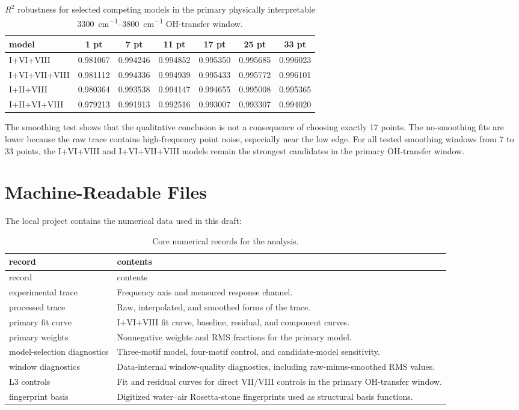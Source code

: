 \documentclass[11pt]{article}
\begin{document}
\begin{table}[H]
\centering
\caption{$R^2$ robustness for selected competing models in the primary physically interpretable \SIrange{3300}{3800}{cm^{-1}} OH-transfer window.}
\begin{tabular}{lcccccc}
\toprule
model & 1 pt & 7 pt & 11 pt & 17 pt & 25 pt & 33 pt \\
\midrule
I+VI+VIII & 0.981067 & 0.994246 & 0.994852 & 0.995350 & 0.995685 & 0.996023 \\
I+VI+VII+VIII & 0.981112 & 0.994336 & 0.994939 & 0.995433 & 0.995772 & 0.996101 \\
I+II+VIII & 0.980364 & 0.993538 & 0.994147 & 0.994655 & 0.995008 & 0.995365 \\
I+II+VI+VIII & 0.979213 & 0.991913 & 0.992516 & 0.993007 & 0.993307 & 0.994020 \\
\bottomrule
\end{tabular}
\end{table}

The smoothing test shows that the qualitative conclusion is not a consequence of choosing exactly 17 points. The no-smoothing fits are lower because the raw trace contains high-frequency point noise, especially near the low edge. For all tested smoothing windows from 7 to 33 points, the I+VI+VIII and I+VI+VII+VIII models remain the strongest candidates in the primary OH-transfer window.

\section*{Machine-Readable Files}

The local project contains the numerical data used in this draft:

\begin{longtable}{p{}p{}}
\caption{Core numerical records for the analysis.}\\
\toprule
record & contents \\
\midrule
\endfirsthead
\toprule
record & contents \\
\midrule
\endhead
experimental trace & Frequency axis and measured response channel. \\
processed trace & Raw, interpolated, and smoothed forms of the trace. \\
primary fit curve & I+VI+VIII fit curve, baseline, residual, and component curves. \\
primary weights & Nonnegative weights and RMS fractions for the primary model. \\
model-selection diagnostics & Three-motif model, four-motif control, and candidate-model sensitivity. \\
window diagnostics & Data-internal window-quality diagnostics, including raw-minus-smoothed RMS values. \\
L3 controls & Fit and residual curves for direct VII/VIII controls in the primary OH-transfer window. \\
fingerprint basis & Digitized water--air Rosetta-stone fingerprints used as structural basis functions. \\
\bottomrule
\end{longtable}
\end{document}
